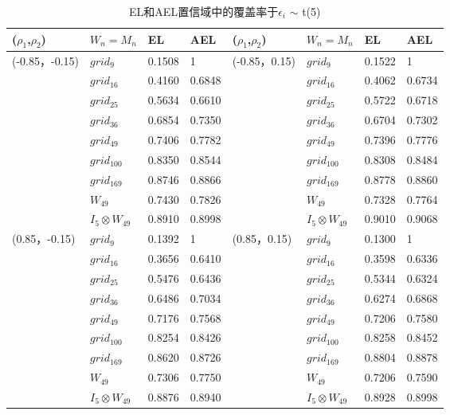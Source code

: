 \documentclass[onecolumn]{ctexart}	%
\begin{document}
\begin{table}[H]
\setlength{\abovecaptionskip}{0.cm}
\centering
\caption{EL和AEL置信域中的覆盖率于$\epsilon_{i}$ $\sim$ t(5)}
\begin{tabular*}{\hsize}{@{}@{\extracolsep{\fill}}llllllll@{}}
\hline
($\rho_{1}$,$\rho_{2}$)&$W_n=M_n$ & EL&AEL&($\rho_{1}$,$\rho_{2}$)&$W_n=M_n$ & EL&AEL\\
\hline
(-0.85，-0.15)& $grid_{9}$  	& 0.1508 & 1          &  (-0.85，0.15)	& $grid_{9}$ & 0.1522 & 1           \\
		& $grid_{16}$   	& 0.4160 & 0.6848 	&                 		& $grid_{16}$  & 0.4062 & 0.6734 \\
		& $grid_{25}$   	& 0.5634 & 0.6610 	&                 		& $grid_{25}$  & 0.5722 & 0.6718 \\
		& $grid_{36}$   	& 0.6854 & 0.7350 	&                	 	& $grid_{36}$  & 0.6704 & 0.7302\\
		& $grid_{49}$   	& 0.7406 & 0.7782 	&                 		& $grid_{49}$  & 0.7396 & 0.7776\\
                      & $grid_{100}$ 	& 0.8350 & 0.8544 	&                 		& $grid_{100}$ & 0.8308 & 0.8484\\
                      & $grid_{169}$ 	& 0.8746 & 0.8866	&                 		& $grid_{169}$ & 0.8778 & 0.8860 \\
                      & $W_{49}$ 	& 0.7430 & 0.7826 &                 		&  $W_{49}$ & 0.7328 & 0.7764    \\
                      & $I_{5}\otimes W_{49}$&0.8910& 0.8998&     &$I_{5}\otimes W_{49}$&   0.9010 &0.9068   \\
\hline
(0.85，-0.15) & $grid_{9}$   	& 0.1392 & 1           &  (0.85，0.15)	& $grid_{9}$  & 0.1300 & 1         \\
		& $grid_{16}$   	& 0.3656 & 0.6410 	&                 		& $grid_{16}$ & 0.3598 & 0.6336\\
		& $grid_{25}$   	& 0.5476 & 0.6436	&                 		& $grid_{25}$ & 0.5344 & 0.6324\\
		& $grid_{36}$   	& 0.6486 & 0.7034   &                 		& $grid_{36}$ & 0.6274 & 0.6868 \\
		& $grid_{49}$   	& 0.7176 & 0.7568   &                  		& $grid_{49}$ & 0.7206 & 0.7580\\
                      & $grid_{100}$ 	& 0.8254 & 0.8426   &                 		& $grid_{100}$ & 0.8258 & 0.8452\\
                      & $grid_{169}$ 	& 0.8620 & 0.8726   &                 		& $grid_{169}$ & 0.8804 & 0.8878 \\
                      & $W_{49}$ 	& 0.7306 & 0.7750&                 		&  $W_{49}$ &  0.7206 & 0.7590 \\
                      & $I_{5}\otimes W_{49}$& 0.8876 &0.8940 	&     &$I_{5}\otimes W_{49}$&0.8928& 0.8998   \\
\hline
\end{tabular*}
\end{table}
\end{document}
